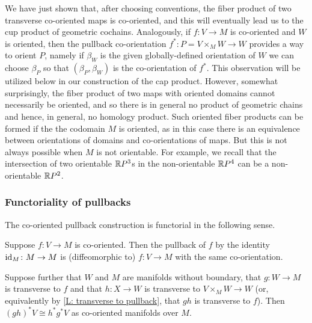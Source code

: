 \begin{remark}\label{R: what products exist}
	We have just shown that, after choosing conventions, the fiber product of two transverse co-oriented maps is co-oriented, and this will eventually lead us to the cup product of geometric cochains.
	Analogously, if $f \colon V \to M$ is co-oriented and $W$ is oriented, then the pullback co-orientation $f^* \colon P = V \times_M W \to W$ provides a way to orient $P$, namely if $\beta_W$ is the given globally-defined orientation of $W$ we can choose $\beta_P$ so that $(\beta_P, \beta_W)$ is the co-orientation of $f^*$.
	This observation will be utilized below in our construction of the cap product.
	However, somewhat surprisingly, the fiber product of two maps with oriented domains cannot necessarily be oriented, and so there is in general no product of geometric chains and hence, in general, no homology product.
	Such oriented fiber products can be formed if the the codomain $M$ is oriented, as in this case there is an equivalence between orientations of domains and co-orientations of maps.
	But this is not always possible when $M$ is not orientable.
	For example, we recall that the intersection of two orientable $\mathbb{R} P^3$s in the non-orientable $\mathbb{R} P^4$ can be a non-orientable $\mathbb{R} P^2$.
\end{remark}

\subsubsection{Functoriality of pullbacks}

The co-oriented pullback construction is functorial in the following sense.

\begin{proposition}\label{P: pullback functoriality}
	Suppose $f \colon V \to M$ is co-oriented.
	Then the pullback of $f$ by the identity $\mathrm{id}_M \colon M \to M$ is (diffeomorphic to) $f \colon V \to M$ with the same co-orientation.

	Suppose further that $W$ and $M$ are manifolds without boundary, that $g \colon W \to M$ is transverse to $f$ and that $h \colon X \to W$ is transverse to $V \times_M W \to W$ (or, equivalently by \cref{L: transverse to pullback}, that $gh$ is transverse to $f$).
	Then $(gh)^*V \cong h^*g^*V$ as co-oriented manifolds over $M$.
\end{proposition}

